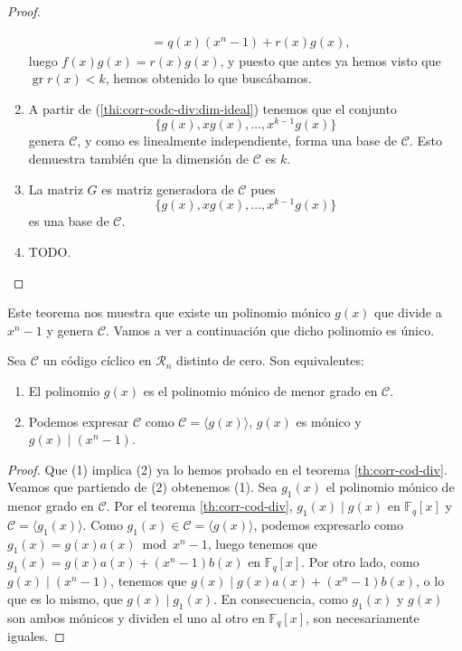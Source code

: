 \begin{proof}
\begin{enumerate}
\begin{align*}
               &= q(x)(x^n - 1) + r(x)g(x),
    \end{align*}
    luego \(f(x)g(x) = r(x)g(x)\), y puesto que antes ya hemos visto que \(\operatorname{gr} r(x) < k\), hemos obtenido lo que buscábamos.
    \item A partir de (\ref{thi:corr-codc-div:dim-ideal}) tenemos que el conjunto \[\{g(x), xg(x), \dots, x^{k-1}g(x)\}\] genera \(\mathcal C\), y como es linealmente independiente, forma una base de \(\mathcal C\).
    Esto demuestra también que la dimensión de \(\mathcal C\) es \(k\).
    \item La matriz \(G\) es matriz generadora de \(\mathcal C\) pues \[\{g(x), xg(x), \dots, x^{k-1}g(x)\}\] es una base de \(\mathcal C\).
    \item TODO. %
  \end{enumerate}
\end{proof}

Este teorema nos muestra que existe un polinomio mónico \(g(x)\) que divide a \(x^n - 1\) y genera \(\mathcal C\).
Vamos a ver a continuación que dicho polinomio es único.

\begin{corollary}
  Sea \(\mathcal C\) un código cíclico en \(\mathcal R_n\) distinto de cero.
  Son equivalentes:
  \begin{enumerate}
    \item El polinomio \(g(x)\) es el polinomio mónico de menor grado en \(\mathcal C\).
    \item Podemos expresar \(\mathcal C\) como \(\mathcal C = \langle g(x)\rangle\), \(g(x)\) es mónico y \(g(x) \mid (x^n -1)\).
  \end{enumerate}
\end{corollary}

\begin{proof}
  Que (1) implica (2) ya lo hemos probado en el teorema \ref{th:corr-cod-div}. 
  Veamos que partiendo de (2) obtenemos (1). 
  Sea \(g_1(x)\) el polinomio mónico de menor grado en \(\mathcal C\).
  Por el teorema \ref{th:corr-cod-div}, \(g_1(x) \mid g(x)\) en \(\mathbb F_q[x]\) y \(\mathcal C = \langle g_1(x)\rangle\).
  Como \(g_1(x) \in \mathcal C = \langle g(x) \rangle\), podemos expresarlo como \(g_1(x) = g(x)a(x) \bmod x^n - 1\), luego tenemos que \(g_1(x) = g(x)a(x) + (x^n - 1)b(x)\) en \(\mathbb F_q[x]\).
  Por otro lado, como \(g(x) \mid (x^n - 1)\), tenemos que \(g(x) \mid g(x)a(x) + (x^n-1)b(x)\), o lo que es lo mismo, que \(g(x) \mid g_1(x)\). 
  En consecuencia, como \(g_1(x)\) y \(g(x)\) son ambos mónicos y dividen el uno al otro en \(\mathbb F_q[x]\), son necesariamente iguales.
\end{proof}

